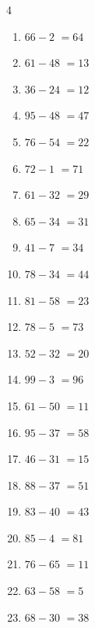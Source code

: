 \begin{multicols}{4}
\begin{enumerate}
  \item $66-2$
        $=64$

  \item $61-48$
        $=13$

  \item $36-24$
        $=12$

  \item $95-48$
        $=47$

  \item $76-54$
        $=22$

  \item $72-1$
        $=71$

\columnbreak %

\resetques

  \item $61-32$
        $=29$

  \item $65-34$
        $=31$

  \item $41-7$
        $=34$

  \item $78-34$
        $=44$

  \item $81-58$
        $=23$

  \item $78-5$
        $=73$

  \item $52-32$
        $=20$

  \item $99-3$
        $=96$

  \item $61-50$
        $=11$

  \item $95-37$
        $=58$

  \item $46-31$
        $=15$

  \item $88-37$
        $=51$

  \item $83-40$
        $=43$

  \item $85-4$
        $=81$

  \item $76-65$
        $=11$

  \item $63-58$
        $=5$

  \item $68-30$
        $=38$


\end{enumerate}
\end{multicols}
